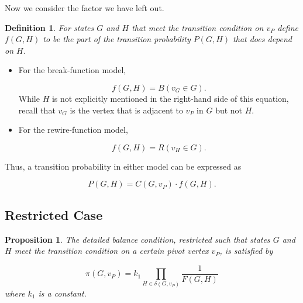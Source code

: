 \documentclass[a4paper,10pt]{article}
\newtheorem{defn}{Definition}
\newtheorem{prop}{Proposition}
\begin{document}
Now we consider the factor we have left out.

\begin{defn} 
For states $G$ and $H$ that meet the transition condition on $v_P$ define $f(G, H)$ to be the part of the transition probability $P(G, H)$ that does depend on $H$.
\end{defn}

\begin{itemize}
 \item For the break-function model,

\begin{equation}
 f(G, H) = B(v_G \in G).
\end{equation}
While $H$ is not explicitly mentioned in the right-hand side of this equation, recall that $v_G$ is the vertex that is adjacent to $v_P$ in $G$ but not $H$.

 \item For the rewire-function model,

\begin{equation}
 f(G, H) = R(v_H \in G).
\end{equation}

\end{itemize}

Thus, a transition probability in either model can be expressed as

\begin{equation}
 P(G, H) = C(G, v_P) \cdot f(G, H).
\end{equation}

\subsection{Restricted Case}

\begin{prop}
 The detailed balance condition, restricted such that states $G$ and $H$ meet the transition condition on a certain pivot vertex $v_P$, is satisfied by

 \begin{equation}
\label{eqn:pi-k1}
  \pi(G, v_P) = k_1 \prod \limits_{H \in \delta(G, v_P)} \frac{1}{F(G, H)}
 \end{equation}
where $k_1$ is a constant.
\end{prop}
\end{document}
